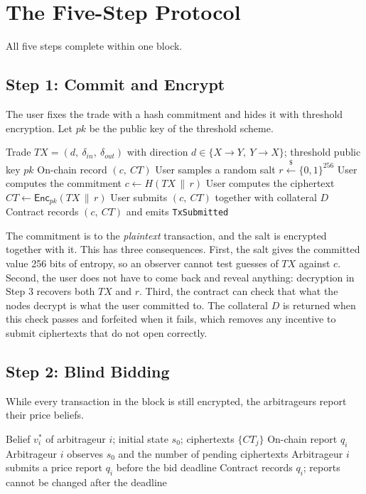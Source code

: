 \section{The Five-Step Protocol}

All five steps complete within one block.

\subsection{Step 1: Commit and Encrypt}

The user fixes the trade with a hash commitment and hides it with threshold encryption. Let $pk$ be the public key of the threshold scheme.

\begin{algorithm}[h]
\caption{User Submission (Step 1)}
\begin{algorithmic}[1]
\Require Trade $TX=(d,\ \delta_{in},\ \delta_{out})$ with direction $d\in\{X\rightarrow Y,\ Y\rightarrow X\}$; threshold public key $pk$
\Ensure On-chain record $(c,\ CT)$
\State User samples a random salt $r\xleftarrow{\$}\{0,1\}^{256}$
\State User computes the commitment $c\leftarrow H(TX\,\|\,r)$
\State User computes the ciphertext $CT\leftarrow \mathsf{Enc}_{pk}(TX\,\|\,r)$
\State User submits $(c,\ CT)$ together with collateral $D$
\State Contract records $(c,\ CT)$ and emits \texttt{TxSubmitted}
\end{algorithmic}
\end{algorithm}

The commitment is to the \emph{plaintext} transaction, and the salt is encrypted together with it. This has three consequences. First, the salt gives the committed value 256 bits of entropy, so an observer cannot test guesses of $TX$ against $c$. Second, the user does not have to come back and reveal anything: decryption in Step 3 recovers both $TX$ and $r$. Third, the contract can check that what the nodes decrypt is what the user committed to. The collateral $D$ is returned when this check passes and forfeited when it fails, which removes any incentive to submit ciphertexts that do not open correctly.

\subsection{Step 2: Blind Bidding}

While every transaction in the block is still encrypted, the arbitrageurs report their price beliefs.

\begin{algorithm}[h]
\caption{Arbitrageur Bidding (Step 2)}
\begin{algorithmic}[1]
\Require Belief $v_i^{*}$ of arbitrageur $i$; initial state $s_0$; ciphertexts $\{CT_j\}$
\Ensure On-chain report $q_i$
\State Arbitrageur $i$ observes $s_0$ and the number of pending ciphertexts
\State Arbitrageur $i$ submits a price report $q_i$ before the bid deadline
\State Contract records $q_i$; reports cannot be changed after the deadline
\end{algorithmic}
\end{algorithm}

